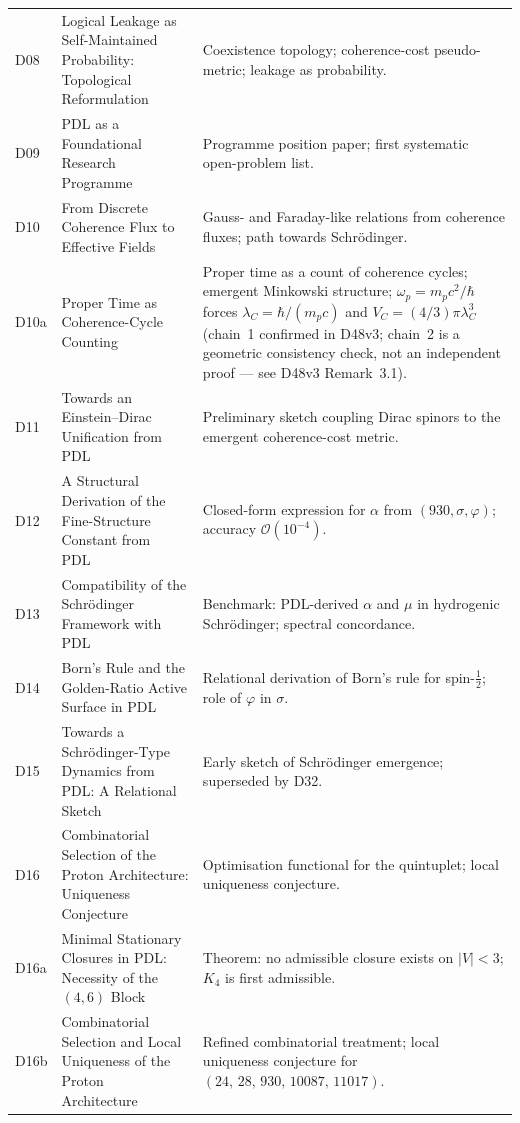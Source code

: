\documentclass[11pt,a4paper]{article}
\theoremstyle{plain}
\theoremstyle{definition}
\theoremstyle{remark}
\newcommand{\quintuplet}{(24,\,28,\,930,\,10087,\,11017)}
\begin{document}
\begin{longtable}{L{1.3cm}L{3.8cm}L{8.0cm}}
D08 & Logical Leakage as Self-Maintained Probability: Topological Reformulation~\cite{D08} & Coexistence topology; coherence-cost pseudo-metric; leakage as probability.\\[0.3em]
D09 & PDL as a Foundational Research Programme~\cite{D09} & Programme position paper; first systematic open-problem list.\\[0.3em]
D10 & From Discrete Coherence Flux to Effective Fields~\cite{D10} & Gauss- and Faraday-like relations from coherence fluxes; path towards Schr\"odinger.\\[0.3em]
D10a & Proper Time as Coherence-Cycle Counting~\cite{D10a} & Proper time as a count of coherence cycles; emergent Minkowski structure; $\omega_p = m_p c^2/\hbar$ forces $\lambda_C = \hbar/(m_p c)$ and $V_C = (4/3)\pi\lambda_C^3$ (chain~1 confirmed in D48v3; chain~2 is a geometric consistency check, not an independent proof --- see D48v3 Remark~3.1).\\[0.3em]
D11 & Towards an Einstein--Dirac Unification from PDL~\cite{D11} & Preliminary sketch coupling Dirac spinors to the emergent coherence-cost metric.\\[0.3em]
D12 & A Structural Derivation of the Fine-Structure Constant from PDL~\cite{D12} & Closed-form expression for $\alpha$ from $(930, \sigma, \varphi)$; accuracy $\mathcal{O}(10^{-4})$.\\[0.3em]
D13 & Compatibility of the Schr\"odinger Framework with PDL~\cite{D13} & Benchmark: PDL-derived $\alpha$ and $\mu$ in hydrogenic Schr\"odinger; spectral concordance.\\[0.3em]
D14 & Born's Rule and the Golden-Ratio Active Surface in PDL~\cite{D14} & Relational derivation of Born's rule for spin-$\tfrac{1}{2}$; role of $\varphi$ in $\sigma$.\\[0.3em]
D15 & Towards a Schr\"odinger-Type Dynamics from PDL: A Relational Sketch~\cite{D15} & Early sketch of Schr\"odinger emergence; superseded by D32.\\[0.3em]
D16 & Combinatorial Selection of the Proton Architecture: Uniqueness Conjecture~\cite{D16} & Optimisation functional for the quintuplet; local uniqueness conjecture.\\[0.3em]
D16a & Minimal Stationary Closures in PDL: Necessity of the $(4,6)$ Block~\cite{D16a} & \textcolor{proofblue}{Theorem}: no admissible closure exists on $|V|<3$; $K_4$ is first admissible.\\[0.3em]
D16b & Combinatorial Selection and Local Uniqueness of the Proton Architecture~\cite{D16b} & Refined combinatorial treatment; local uniqueness conjecture for $\quintuplet$.\\[0.3em]

\end{longtable}
\end{document}
